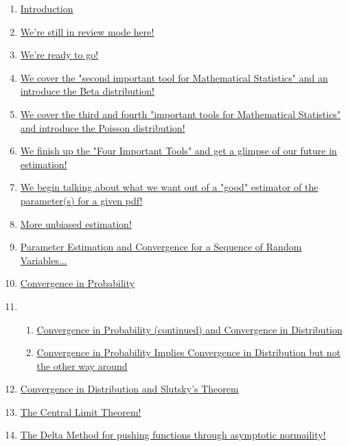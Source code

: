 \documentclass[11pt]{article}
\begin{document}
\begin{enumerate}
	\item \href{https://mp.weixin.qq.com/s/WAlIYvp8hZ1NN1I9kbRLPA}{Introduction}	%
	\item \href{https://mp.weixin.qq.com/s/3aCEMb2ccvTc6FqfFLQupA}{We're still in review mode here!}	%
	\item \href{https://mp.weixin.qq.com/s/t2JR3xHp1JjbUyv6O6vL3w}{We're ready to go!}	%
	\item \href{https://www.youtube.com/watch?v=_6JW5qdOZG8}{We cover the "second important tool for Mathematical Statistics" and an introduce the Beta distribution!}	%
	\item \href{https://mp.weixin.qq.com/s/Bnwdzn82c9FarCrEAnOcSQ}{We cover the third and fourth "important tools for Mathematical Statistics" and introduce the Poisson distribution!}	%
	\item \href{https://mp.weixin.qq.com/s/_PDcUuJnzPbsxkXyydwJaA}{We finish up the "Four Important Tools" and get a glimpse of our future in estimation!}	%
	\item \href{https://mp.weixin.qq.com/s/29jfi4_ko8T4k5SHZWt_cA}{We begin talking about what we want out of a "good" estimator of the parameter(s) for a given pdf!}	%
	\item \href{https://mp.weixin.qq.com/s/E7ibo0xlsduayzTEsfbBjQ}{More unbiased estimation!}	%
	\item \href{https://mp.weixin.qq.com/s/DX6XBVxMpEYYbSLdkX3OhA}{Parameter Estimation and Convergence for a Sequence of Random Variables...}	%
	\item \href{https://mp.weixin.qq.com/s/ZgoRDPlnrUYx7wkuz9-B0w}{Convergence in Probability}	%
	\item 
	\begin{enumerate}
		\item \href{https://mp.weixin.qq.com/s/mlIfFntw0Ob_IkHgjdDnAg}{Convergence in Probability (continued) and Convergence in Distribution}	%
		\item \href{https://mp.weixin.qq.com/s/mlIfFntw0Ob_IkHgjdDnAg}{Convergence in Probability Implies Convergence in Distribution but not the other way around}	%
	\end{enumerate}
	\item \href{https://mp.weixin.qq.com/s/ANTyTu-Q0xjNNLVMBUg55A}{Convergence in Distribution and Slutsky's Theorem}	%
	\item \href{https://mp.weixin.qq.com/s/ipiPqZSUoitOvKkQjDsp_g}{The Central Limit Theorem!}	%
	\item \href{https://mp.weixin.qq.com/s/XHIB0bVDKXt2z4QXVexSJw}{The Delta Method for pushing functions through asymptotic normaility!}	%

\end{enumerate}
\end{document}
